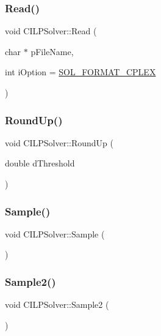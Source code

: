 \subsubsection{\texorpdfstring{Read()}{Read()}}
{\footnotesize\ttfamily void C\+I\+L\+P\+Solver\+::\+Read (\begin{DoxyParamCaption}\item[{char $\ast$}]{p\+File\+Name,  }\item[{int}]{i\+Option = {\ttfamily \mbox{\hyperlink{ILPSolver_8h_acee7a96f3deaccde51231b3aa7c8bcb2}{S\+O\+L\+\_\+\+F\+O\+R\+M\+A\+T\+\_\+\+C\+P\+L\+EX}}} }\end{DoxyParamCaption})}

\mbox{\label{classCILPSolver_a3551534866ccdc50262d2294157dae84}} 
\subsubsection{\texorpdfstring{RoundUp()}{RoundUp()}}
{\footnotesize\ttfamily void C\+I\+L\+P\+Solver\+::\+Round\+Up (\begin{DoxyParamCaption}\item[{double}]{d\+Threshold }\end{DoxyParamCaption})}

\mbox{\label{classCILPSolver_a1d1ea568feb782e04e1b0125fc6e5259}} 
\subsubsection{\texorpdfstring{Sample()}{Sample()}}
{\footnotesize\ttfamily void C\+I\+L\+P\+Solver\+::\+Sample (\begin{DoxyParamCaption}{ }\end{DoxyParamCaption})}

\mbox{\label{classCILPSolver_a0317f6476130a3e99e2f771ce9dddb5e}} 
\subsubsection{\texorpdfstring{Sample2()}{Sample2()}}
{\footnotesize\ttfamily void C\+I\+L\+P\+Solver\+::\+Sample2 (\begin{DoxyParamCaption}{ }\end{DoxyParamCaption})}

